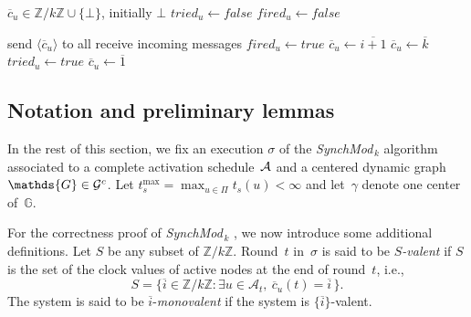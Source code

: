 \documentclass{article}
\newcommand{\cent}{\gamma}
\newcommand{\dG}{\mathds{G}}
\newcommand{\SM}{{\em SynchMod}$_{\,k}$ }
\begin{document}
\begin{algorithm}[htb]\label{algo:code}
\begin{distribalgo}[1]
\BLANK {}
	\STATE $\overline{c}_u \in \mathds{Z}/k\mathds{Z} \cup \{\bot\}$, initially $\bot$
	\STATE $tried_u \leftarrow false$
	\STATE $fired_u \leftarrow false$

\ENDINDENT \BLANK

	\STATE send $\langle \overline{c}_u \rangle$ to all 
	\STATE receive incoming messages
		\STATE $fired_u \leftarrow true$ \label{line:fire}
	\ENDIF
		\STATE $\overline{c}_u \leftarrow \overline{i+1} $ \label{line:agreed}
	\ELSE {}
		\STATE $\overline{c}_u \leftarrow \overline{k} $  \label{line:try}
		\STATE $tried_u \leftarrow true$   \label{line:try+1}%
		\ELSE
		\STATE $\overline{c}_u \leftarrow \overline{1} $ \label{line:tried}%
	  \ENDIF
	  \ENDIF
\ENDINDENT 

\caption{The \SM algorithm} \label{algo:R}
\end{distribalgo}

\end{algorithm}


\subsection{Notation and preliminary lemmas}

In the rest of this section, we fix an execution $\sigma$ of the \SM algorithm associated to a complete activation 
	schedule~${\cal A}$ and a centered dynamic graph~$\dG \in {\cal G}^c$. %
Let $t_s^{\max} = \max_{u \in \Pi}  t_s(u) < \infty$ and let~$\cent$ denote one center of~$\dG$.	


For the correctness proof of \SM, we now introduce some additional definitions.
Let $S$ be any subset of $ \mathds{Z}/k\mathds{Z}$.
Round~$t$ in~$\sigma$  is said to be \emph{$S$-valent}  if $S$ is the set of the clock values of active nodes 
	at the end of round~$t$, i.e.,
	$$ S = \{ \overline{i}  \in \mathds{Z}/k\mathds{Z} : \exists u \in \mathcal{A}_t, \ \overline{c}_u (t) = \overline{ i }\,  \}  . $$
The system is said to be $\overline{i}$-\emph{monovalent}  if the system is $\{ \overline{i}\}$-valent.
\end{document}

